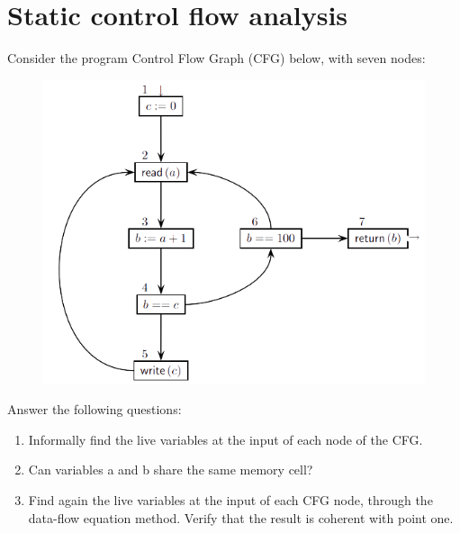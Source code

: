 \documentclass[12pt, a4paper]{report}
\newtheorem[style=M, bodystyle=\normalfont]{theorem}{Theorem}
\newtheorem[style=M, bodystyle=\normalfont]{corollary}{Corollary}
\newtheorem[style=M, bodystyle=\normalfont]{lemma}{Lemma}
\newtheorem[style=M, bodystyle=\normalfont]{definition}{Definition}
\begin{document}
    \section{Static control flow analysis}
        Consider the program Control Flow Graph (CFG) below, with seven nodes:
        \begin{figure}[H]
            \centering
            \includegraphics[width=0.75\linewidth]{images/CFG.png}
        \end{figure} 
        Answer the following questions:
        \begin{enumerate}
            \item Informally find the live variables at the input of each node of the CFG.
            \item Can variables a and b share the same memory cell?
            \item Find again the live variables at the input of each CFG node, through the data-flow equation method. Verify that the result is coherent with point one. 
        \end{enumerate}
\end{document}
